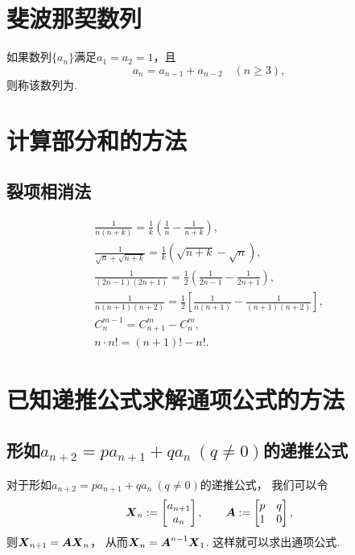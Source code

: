 \section{斐波那契数列}
如果数列\(\{a_n\}\)满足\(a_1=a_2=1\)，且\begin{equation*}
a_n = a_{n-1} + a_{n-2} \quad(n\geq3),
\end{equation*}则称该数列为.

\section{计算部分和的方法}
\subsection{裂项相消法}
\begin{gather}
	\frac1{n(n+k)}
	= \frac1k \left( \frac1n - \frac1{n+k} \right), \\
	\frac1{\sqrt{n}+\sqrt{n+k}}
	= \frac1k \left( \sqrt{n+k} - \sqrt{n} \right), \\
	\frac1{(2n-1)(2n+1)}
	= \frac12 \left( \frac1{2n-1} - \frac1{2n+1} \right), \\
	\frac1{n(n+1)(n+2)}
	= \frac12 \left[ \frac1{n(n+1)} - \frac1{(n+1)(n+2)} \right], \\
	C_n^{m-1} = C_{n+1}^m - C_n^m, \\
	n \cdot n! = (n+1)! - n!.
\end{gather}

\section{已知递推公式求解通项公式的方法}
\subsection{\texorpdfstring{形如\(a_{n+2}=p a_{n+1} + q a_n\ (q\neq0)\)的递推公式}{第一类递推公式}}
对于形如\(a_{n+2}=p a_{n+1} + q a_n\ (q\neq0)\)的递推公式，
我们可以令\begin{equation*}
	\boldsymbol{X}_n
	:= \begin{bmatrix}
		a_{n+1} \\
		a_n
	\end{bmatrix},
	\qquad
	\boldsymbol{A}
	:= \begin{bmatrix}
		p & q \\
		1 & 0
	\end{bmatrix},
\end{equation*}
则\(\boldsymbol{X}_{n+1} = \boldsymbol{A} \boldsymbol{X}_n\)，
从而\(\boldsymbol{X}_n = \boldsymbol{A}^{n-1} \boldsymbol{X}_1\).
这样就可以求出通项公式.


